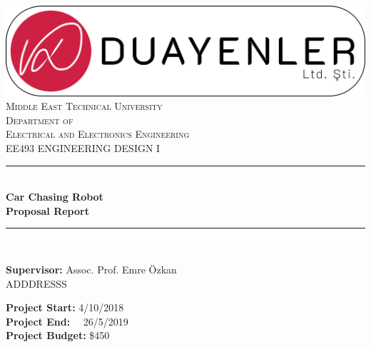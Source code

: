 \documentclass[a4paper,12pt]{article}
\begin{document}
\begin{titlepage}

\newcommand{\HRule}{\rule{\linewidth}{0.5mm}} %
\centering 

\includegraphics[width=\textwidth,height=\textheight,keepaspectratio]{../../Documents/logos/logo3-with-stroke}\\[0.5cm]

\textsc{\LARGE Middle East Technical University}\\[0.5cm] %
\textsc{\Large Department of \\Electrical and Electronics Engineering }\\[0.5cm] %
\textsc{\large EE493 ENGINEERING DESIGN I}\\[0.5cm] %


\HRule \\[0cm]
{ \huge \bfseries  Car Chasing Robot\\[0.1cm] \LARGE \bfseries Proposal Report}\\[0cm] %
\HRule \\[1cm]

\begin{minipage}[l]{0.6\textwidth}
\raggedright
		\large{\textbf{Supervisor:}}	Assoc. Prof. Emre Özkan \\
		\hspace{3.05cm}\color{red} ADDDRESSS

\end{minipage}
\begin{minipage}[r]{0.35\textwidth}
\raggedright
		\textbf{Project Start:} 4/10/2018\\
		\textbf{Project End:} \ \  26/5/2019\\
		\textbf{Project Budget:} \$450


\end{minipage}
\end{titlepage}
\end{document}
